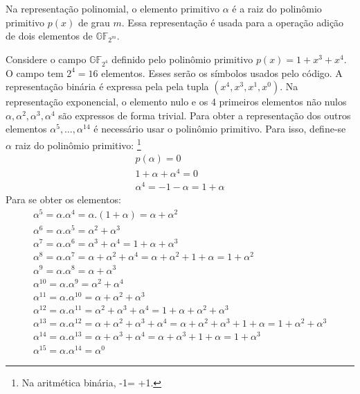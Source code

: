 Na representação polinomial, o elemento primitivo $\alpha$ é a raiz do polinômio primitivo $p(x)$ de grau $m$. Essa representação é usada para a operação adição de dois elementos de $\mathbb{GF}_{2^m}$.

\begin{example}
Considere o campo $\mathbb{GF}_{2^4}$ definido pelo polinômio primitivo $p(x)=1 + x^3 + x^4$.  O campo tem $2^4=16$ elementos. Esses serão os símbolos usados pelo código. A representação binária é expressa pela pela tupla $(x^4, x^3, x^1, x^0)$. Na representação exponencial, o elemento nulo e os 4 primeiros elementos não nulos $\alpha, \alpha^2, \alpha^3, \alpha^4$ são expressos de forma trivial. Para obter a representação dos outros elementos $\alpha^5, \ldots , \alpha^{14}$ é necessário usar o polinômio primitivo. Para isso, define-se $\alpha$ raiz do polinômio primitivo: \footnote{Na aritmética binária, -1= +1.}
\begin{align*}
p(\alpha) = 0\\
1 + \alpha + \alpha^4 = 0\\
\alpha^4 = -1-\alpha = 1+\alpha
\end{align*}
Para se obter os elementos:
\begin{align*}
\alpha^5 = \alpha.\alpha^4 = \alpha.(1+ \alpha) = \alpha + \alpha^2\\
\alpha^6 = \alpha.\alpha^5 = \alpha^2 + \alpha^3\\
\alpha^7 = \alpha.\alpha^6 = \alpha^3 + \alpha^4 = 1 + \alpha + \alpha^3\\
\alpha^8 = \alpha.\alpha^7 = \alpha + \alpha^2 + \alpha^4  = \alpha + \alpha^2 + 1 + \alpha = 1 + \alpha^2\\
\alpha^9 = \alpha.\alpha^8 = \alpha + \alpha^3\\
\alpha^{10} = \alpha.\alpha^9 = \alpha^2 + \alpha^4\\
\alpha^{11} = \alpha.\alpha^{10} = \alpha + \alpha^2 + \alpha^3\\
\alpha^{12} = \alpha.\alpha^{11} = \alpha^2 + \alpha^3 + \alpha^4 = 1 + \alpha + \alpha^2 + \alpha ^3\\
\alpha^{13} = \alpha.\alpha^{12} = \alpha + \alpha^2 + \alpha^3 + \alpha^4 = \alpha + \alpha^2 + \alpha^3 + 1 + \alpha = 1 + \alpha^2 + \alpha^3\\
\alpha^{14} = \alpha.\alpha^{13} = \alpha + \alpha^3 + \alpha^4 = \alpha + \alpha^3 + 1 + \alpha = 1 + \alpha^3\\
\alpha^{15} = \alpha.\alpha^{14} = \alpha^0
\end{align*}



\end{example}


